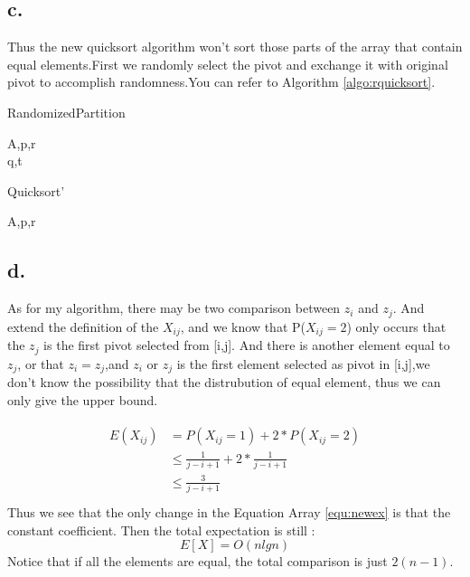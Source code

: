 \documentclass[oneside]{homework} %
\begin{document}
\subsection* {c.}
Thus the new quicksort algorithm won't sort those parts of the array that contain equal elements.First we randomly select the pivot and exchange it with original pivot to accomplish randomness.You can refer to Algorithm \ref{algo:rquicksort}.
  \begin{algorithm}[!h]
  \caption{RandomizedPartition}
  \label{algo:rp}
  \begin{algorithmic}[1]
	\REQUIRE A,p,r
	\ENSURE ~ ~\\ 
	\LASTCON q,t
  \end{algorithmic}
  \end{algorithm}

  \begin{algorithm}[!h]
  \caption{Quicksort'}
  \label{algo:rquicksort}
  \begin{algorithmic}[1]
	\REQUIRE A,p,r
	\ENSURE ~ ~\\ 
	\ENDIF
	\LASTCON
  \end{algorithmic}
  \end{algorithm}
\subsection* {d.}
As for my algorithm, there may be two comparison between $z_{i}$ and $z_{j}$.
And extend the definition of the $X_{ij}$, and we know that P($X_{ij} = 2$) only occurs that the $z_{j}$ is the first pivot selected from [i,j]. And there is another element equal to $z_{j}$, or that $z_{i} = z_{j}$,and $z_{i}$ or $z_{j}$ is the first element selected as pivot in [i,j],we don't know the possibility that the distrubution of equal element, thus we can only give the upper bound.

\begin{eqnarray}
  \begin{split}
	E(X_{ij}) &= P(X_{ij}=1) + 2*P(X_{ij}=2) \\
	&\leq \frac{1}{j-i+1} + 2*\frac{1}{j-i+1} \\
	&\leq \frac{3}{j-i+1} \\
  \end{split}
  \label{equ:newex}
\end{eqnarray}
Thus we see that the only change in the Equation Array \ref{equ:newex} is that the constant coefficient.  Then the total expectation is still :
$$E[X] = O(nlgn)$$
Notice that if all the elements are equal, the total comparison is just $2(n-1)$.
\end{document}
